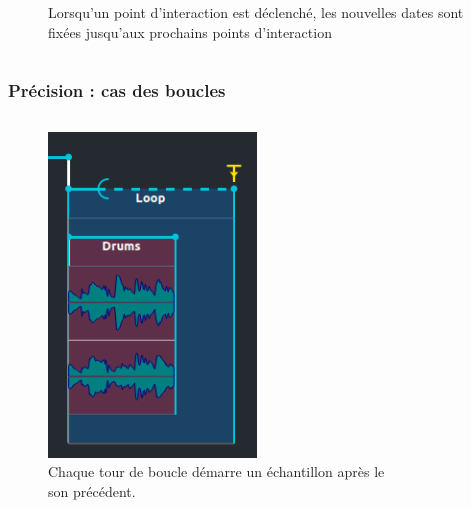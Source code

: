 \documentclass[draft]{beamer}
\begin{document}
\begin{frame}
\begin{columns}
\begin{column}{0.5\textwidth}
\begin{figure}
				\caption{Lorsqu'un point d'interaction est déclenché, les nouvelles dates sont fixées jusqu'aux prochains points d'interaction}
			\end{figure}
		\end{column}
	\end{columns}
\end{frame}  

\begin{frame}
	\frametitle{Précision : cas des boucles}
	\Large
	
	\begin{columns}
		\begin{column}{0.5\textwidth}
			\begin{figure}
				\centering
				\includegraphics[width=0.62\textwidth]{images/loop.png}
				\caption{Chaque tour de boucle démarre un échantillon après le son précédent.}
			\end{figure}
		\end{column}
		\begin{column}{0.5\textwidth}
			\begin{figure}
				\centering

\end{figure}
\end{column}
\end{columns}
\end{frame}
\end{document}
